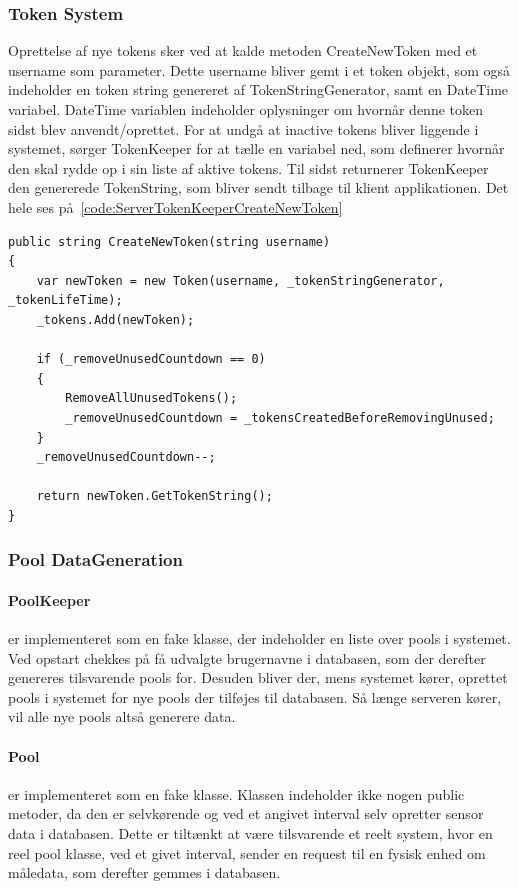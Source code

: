 \subsubsection{Token System}
Oprettelse af nye tokens sker ved at kalde metoden CreateNewToken med et username som parameter. Dette username bliver gemt i et token objekt, som også indeholder en token string genereret af TokenStringGenerator, samt en DateTime variabel. DateTime variablen indeholder oplysninger om hvornår denne token sidst blev anvendt/oprettet.
For at undgå at inactive tokens bliver liggende i systemet, sørger TokenKeeper for at tælle en variabel ned, som definerer hvornår den skal rydde op i sin liste af aktive tokens. Til sidst returnerer TokenKeeper den genererede TokenString, som bliver sendt tilbage til klient applikationen. Det hele ses på~\ref{code:ServerTokenKeeperCreateNewToken}
\begin{lstlisting}[caption=Server.TokenKeeper.CreateNewToken, label=code:ServerTokenKeeperCreateNewToken]
public string CreateNewToken(string username)
{
	var newToken = new Token(username, _tokenStringGenerator, _tokenLifeTime);
	_tokens.Add(newToken);
	
	if (_removeUnusedCountdown == 0)
	{
		RemoveAllUnusedTokens();
		_removeUnusedCountdown = _tokensCreatedBeforeRemovingUnused;
	}
	_removeUnusedCountdown--;
	
	return newToken.GetTokenString();
}
\end{lstlisting}

\subsubsection{Pool DataGeneration}
\paragraph{PoolKeeper} er implementeret som en fake klasse, der indeholder en liste over pools i systemet. Ved opstart chekkes på få udvalgte brugernavne i databasen, som der derefter genereres tilsvarende pools for. Desuden bliver der, mens systemet kører, oprettet pools i systemet for nye pools der tilføjes til databasen. Så længe serveren kører, vil alle nye pools altså generere data.

\paragraph{Pool} er implementeret som en fake klasse. Klassen indeholder ikke nogen public metoder, da den er selvkørende og ved et angivet interval selv opretter sensor data i databasen. Dette er tiltænkt at være tilsvarende et reelt system, hvor en reel pool klasse, ved et givet interval, sender en request til en fysisk enhed om måledata, som derefter gemmes i databasen.

